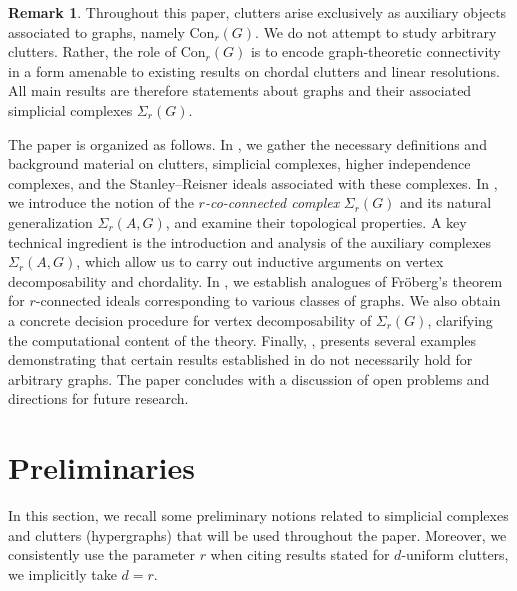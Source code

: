 \documentclass[12pt,reqno]{amsart}
\theoremstyle{definition}
\newtheorem{remark}[proposition]{Remark}
\newcommand{\Con}{{\mathrm{Con}}}
\begin{document}
\begin{remark}
Throughout this paper, clutters arise exclusively as auxiliary objects associated to graphs, namely $\Con_r(G)$. 
We do not attempt to study arbitrary clutters. 
Rather, the role of $\Con_r(G)$ is to encode graph-theoretic connectivity in a form amenable to existing results on chordal clutters and linear resolutions. 
All main results are therefore statements about graphs and their associated simplicial complexes $\Sigma_r(G)$.     
\end{remark}

    
The paper is organized as follows. In , we gather the necessary definitions and background material on clutters, simplicial complexes, higher independence complexes, and the Stanley–Reisner ideals associated with these complexes. 
In , we introduce the notion of the \emph{$r$-co-connected complex} $\Sigma_r(G)$ and its natural generalization $\Sigma_r(A,G)$, and examine their topological properties. 
A key technical ingredient is the introduction and analysis of the auxiliary complexes $\Sigma_r(A, G)$, which allow us to carry out inductive arguments on vertex decomposability and chordality.
In , we establish analogues of Fr\"oberg’s theorem for $r$-connected ideals corresponding to various classes of graphs. 
We also obtain a concrete decision procedure for vertex decomposability of $\Sigma_r(G)$, clarifying the computational content of the theory.
Finally, , presents several examples demonstrating that certain results established in  do not necessarily hold for arbitrary graphs.
The paper concludes with a discussion of open problems and directions for future research.
	 
	
	
	
 


	\section{Preliminaries}\label{preliminaries}
	
	In this section, we recall some preliminary notions related to simplicial complexes and clutters (hypergraphs) that will be used throughout the paper.
Moreover, we consistently use the parameter $r$ when citing results stated for $d$-uniform clutters, we implicitly take $d=r$.
\end{document}
